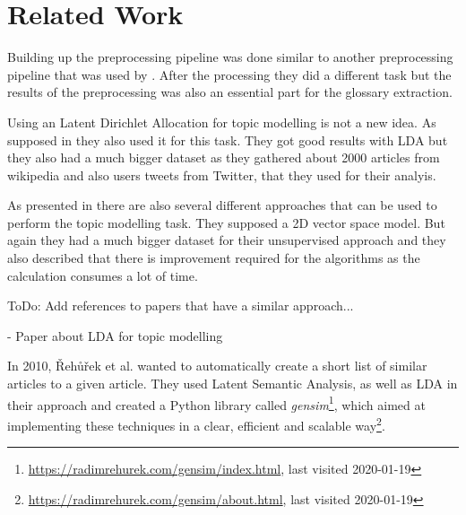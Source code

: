 \section{Related Work} %
\label{sec:related_work}

Building up the preprocessing pipeline was done similar to another preprocessing pipeline that was used by \cite{gemkow_automatic_2018}. After the processing they did a different task but the results of the preprocessing was also an essential part for the glossary extraction.

Using an Latent Dirichlet Allocation for topic modelling is not a new idea. As supposed in \cite{zhou_tong_text_2016} they also used it for this task. They got good results with LDA but they also had a much bigger dataset as they gathered about 2000 articles from wikipedia and also users tweets from Twitter, that they used for their analyis.

As presented in \cite{george_unsupervised_2018} there are also several different approaches that can be used to perform the topic modelling task. They supposed a 2D vector space model. But again they had a much bigger dataset for their unsupervised approach and they also described that there is improvement required for the algorithms as the calculation consumes a lot of time.


\colorbox{yellow!30}{ToDo:} Add references to papers that have a similar approach...

- Paper about LDA for topic modelling

In 2010, {\v R}eh{\r u}{\v r}ek et al. wanted to automatically create a short list of similar articles to a given article\cite{rehurek_software_2010}. They used Latent Semantic Analysis, as well as LDA in their approach and created a Python library called \emph{gensim}\footnote{\url{https://radimrehurek.com/gensim/index.html}, last visited 2020-01-19\label{fn:gensim_website}}, which aimed at implementing these techniques in a clear, efficient and scalable way\footnote{\url{https://radimrehurek.com/gensim/about.html}, last visited 2020-01-19}.